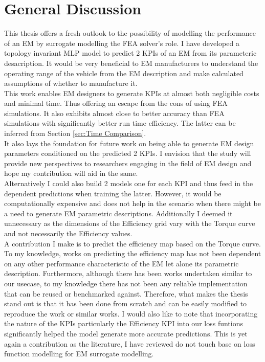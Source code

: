\documentclass{report} %
\begin{document}
\section{General Discussion}\label{sec:General Discussion}
This thesis offers a fresh outlook to the possibility of modelling the performance of an \ac{EM} by surrogate modelling the \ac{FEA} solver's role.
I have developed a topology invariant \ac{MLP} model to predict 2 \ac{KPI}s of an \ac{EM} from its parameteric desacription. 
It would be very beneficial to \ac{EM} manufacturers to understand the operating range of the vehicle from the \ac{EM} description and make calculated assumptions of 
whether to manufacture it.\\
This work enables \ac{EM} designers to generate \ac{KPI}s at almost both negligible costs and minimal time.
Thus offering an escape from the cons of using \ac{FEA} simulations. It also exhibits almost close to better accuracy than \ac{FEA} simulations with significantly 
better run time efficiency. The latter can be inferred from Section \ref{sec:Time Comparison}.\\

It also lays the foundation for future work on being able to generate \ac{EM} design parameters conditioned on the predicted 2 KPIs.
I envision that the study will provide new perspectives to researchers engaging in the field of \ac{EM} design and hope my contribution will aid in the same.\\
Alternatively I could also build 2 models one for each \ac{KPI} and thus feed in the dependent predictions when training the latter. 
However, it would be computationally expensive and does not help in the scenario when there might be a need to generate \ac{EM} parametric descriptions.
Additionally I deemed it unnecessary as the dimensions of the Efficiency grid vary with the Torque curve and not necessarily the Efficiency values. \\

A contribution I make is to predict the efficiency map based on the Torque curve. To my knowledge, works on predicting the efficiency map has not 
been dependent on any other performance characteristic of the \ac{EM} let alone its parametric description. Furthermore, although there has been works undertaken similar 
to our usecase, to my knowledge there has not been any reliable implementation that can be reused or benchmarked against. Therefore, what makes the thesis stand out is 
that it has been done from scratch and can be easily modified to reproduce the work or similar works.
I would also like to note that incorporating the nature of the \ac{KPI}s particularly the Efficiency \ac{KPI} into our loss funtions significantly helped the model generate 
more accurate predictions. This is yet again a contribution as the literature, I have reviewed do not touch base on loss function modelling for \ac{EM} surrogate modelling.\\
\end{document}

